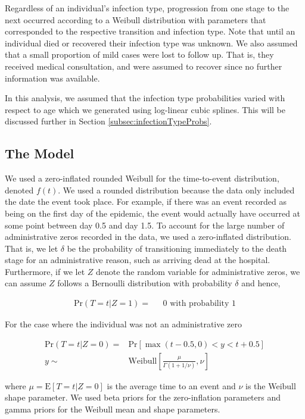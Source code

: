 \documentclass[12pt]{article}
\begin{document}
Regardless of an individual's infection type, progression from one
stage to the next occurred according to a Weibull distribution with
parameters that corresponded to the respective transition and
infection type. Note that until an individual died or recovered
their infection type was unknown.  We also assumed that a small
proportion of mild cases were lost to follow up. That is, they
received medical consultation, and were assumed to recover since no
further information was available.

In this analysis, we assumed that the infection type probabilities varied with respect to age which we generated using log-linear cubic splines.  
This will be discussed further in Section \ref{subsec:infectionTypeProbs}.

\subsection{The Model}
\label{subsec:theModel}

We used a zero-inflated rounded Weibull for the time-to-event
distribution, denoted $f(t)$.  We used a rounded distribution
because the data only included the date the event took place. For
example, if there was an event recorded as being on the first day of
the epidemic, the event would actually have occurred at some point
between day 0.5 and day 1.5. To account for the large number of
administrative zeros recorded in the data, we used a zero-inflated
distribution.  That is, we let $\delta$ be the probability of
transitioning immediately to the death stage for an administrative
reason, such as arriving dead at the hospital. Furthermore, if we
let $Z$ denote the random variable for administrative zeros, we can
assume $Z$ follows a Bernoulli distribution with probability
$\delta$ and hence,

\begin{align*}
\text{Pr}(T=t|Z=1) =&\text{ }0 \text{ with probability } 1
\end{align*}

\noindent For the case where the individual was not an
administrative zero

\begin{align*}
\text{Pr}(T=t|Z=0) =&  \text{Pr}[\max(t-0.5,0) < y < t+0.5]\\
y \sim & \text{Weibull}\left [\frac{\mu}{\Gamma(1 + 1/\nu)}, \nu
\right]
\end{align*}

\noindent where $\mu = \mbox{E}[T = t|Z = 0]$ is the average time to
an event and $\nu$ is the Weibull shape parameter. We used beta
priors for the zero-inflation parameters and gamma priors for the
Weibull mean and shape parameters.
\end{document}
